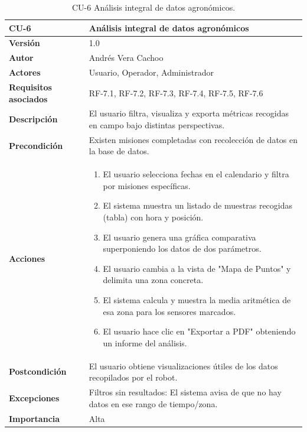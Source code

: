 \begin{table}[H]
	\centering
	\begin{tabularx}{\linewidth}{ p{} p{} }
		\toprule
		\textbf{CU-6}    & \textbf{Análisis integral de datos agronómicos}\\
		\toprule
		\textbf{Versión}              & 1.0    \\
		\textbf{Autor}                & Andrés Vera Cachoo \\
		\textbf{Actores}              & Usuario, Operador, Administrador \\
		\textbf{Requisitos asociados} & RF-7.1, RF-7.2, RF-7.3, RF-7.4, RF-7.5, RF-7.6 \\
		\textbf{Descripción}          & El usuario filtra, visualiza y exporta métricas recogidas en campo bajo distintas perspectivas. \\
		\textbf{Precondición}         & Existen misiones completadas con recolección de datos en la base de datos. \\
		\textbf{Acciones}             &
		\begin{enumerate}
			\def\labelenumi{\arabic{enumi}.}
			\tightlist
			\item El usuario selecciona fechas en el calendario y filtra por misiones específicas.
			\item El sistema muestra un listado de muestras recogidas (tabla) con hora y posición.
			\item El usuario genera una gráfica comparativa superponiendo los datos de dos parámetros.
            \item El usuario cambia a la vista de "Mapa de Puntos" y delimita una zona concreta.
            \item El sistema calcula y muestra la media aritmética de esa zona para los sensores marcados.
            \item El usuario hace clic en "Exportar a PDF" obteniendo un informe del análisis.
		\end{enumerate}\\
		\textbf{Postcondición}        & El usuario obtiene visualizaciones útiles de los datos recopilados por el robot. \\
		\textbf{Excepciones}          & Filtros sin resultados: El sistema avisa de que no hay datos en ese rango de tiempo/zona. \\
		\textbf{Importancia}          & Alta \\
		\bottomrule
	\end{tabularx}
	\caption{CU-6 Análisis integral de datos agronómicos.}
\end{table}

